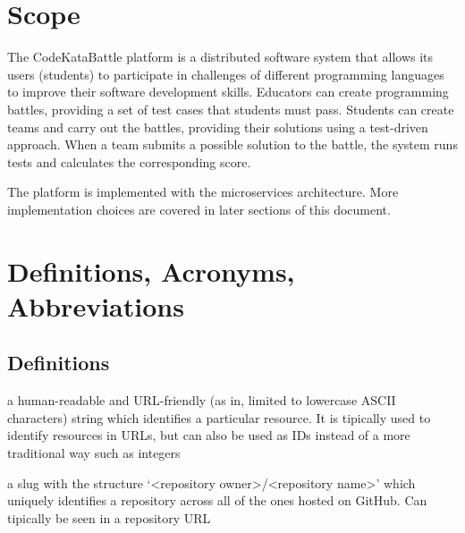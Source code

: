 \section{Scope}
The CodeKataBattle platform is a distributed software system that allows its users (students) to participate in challenges of different programming languages to improve their software development skills.
Educators can create programming battles, providing a set of test cases that students must pass.
Students can create teams and carry out the battles, providing their solutions using a test-driven approach.
When a team submits a possible solution to the battle, the system runs tests and calculates the corresponding score.

The platform is implemented with the microservices architecture. 
More implementation choices are covered in later sections of this document.

\section{Definitions, Acronyms, Abbreviations}

\subsection{Definitions}
\begin{description}[leftmargin=0pt]
    \item[Slug:] a human-readable and URL-friendly (as in, limited to lowercase ASCII characters) string which
          identifies a particular resource. It is tipically used to identify resources in URLs, but can also be used
          as IDs instead of a more traditional way such as integers
    \item[GitHub Repository Slug:] a slug with the structure `<repository owner>/<repository name>' which uniquely
          identifies a repository across all of the ones hosted on GitHub. Can tipically be seen in a repository URL
\end{description}

